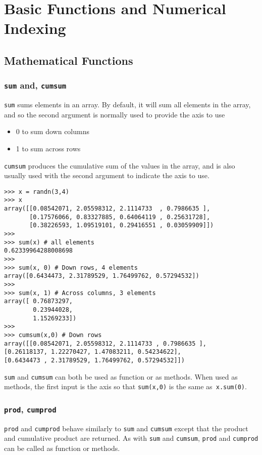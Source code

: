 \documentclass[KSmain.tex]{subfiles}
\begin{document}
 

\section{Basic Functions and Numerical Indexing}
\subsection{Mathematical Functions}
\subsubsection*{\texttt{sum} and, \texttt{cumsum}}
\texttt{sum} sums elements in an array. By default, it will sum all elements in the array, and so the second argument
is normally used to provide the axis to use 
\begin{itemize}
\item 0 to sum down columns
\item 1 to sum across rows
\end{itemize}
\texttt{cumsum} produces
the cumulative sum of the values in the array, and is also usually used with the second argument to indicate
the axis to use.
\begin{framed}
\begin{verbatim}
>>> x = randn(3,4)
>>> x
array([[0.08542071, 2.05598312, 2.1114733  , 0.7986635 ],
       [0.17576066, 0.83327885, 0.64064119 , 0.25631728],
       [0.38226593, 1.09519101, 0.29416551 , 0.03059909]])
>>>
>>> sum(x) # all elements
0.62339964288008698
>>>
>>> sum(x, 0) # Down rows, 4 elements
array([0.6434473, 2.31789529, 1.76499762, 0.57294532])
>>>
>>> sum(x, 1) # Across columns, 3 elements
array([ 0.76873297, 
        0.23944028,
        1.15269233])
>>>
>>> cumsum(x,0) # Down rows
array([[0.08542071, 2.05598312, 2.1114733 , 0.7986635 ],
[0.26118137, 1.22270427, 1.47083211, 0.54234622],
[0.6434473 , 2.31789529, 1.76499762, 0.57294532]])
\end{verbatim}
\end{framed}
\noindent \texttt{sum} and \texttt{cumsum} can both be used as function or as methods. When used as methods, the first input is the
axis so that \texttt{sum(x,0)} is the same as\texttt{ x.sum(0)}.
\newpage
\subsubsection*{\texttt{prod}, \texttt{cumprod}}
\texttt{prod} and \texttt{cumprod} behave similarly to \texttt{sum} and \texttt{cumsum} except that the product and cumulative product are
returned. As with \texttt{sum} and \texttt{cumsum}, \texttt{prod} and \texttt{cumprod} can be called as function or methods.
\end{document}
